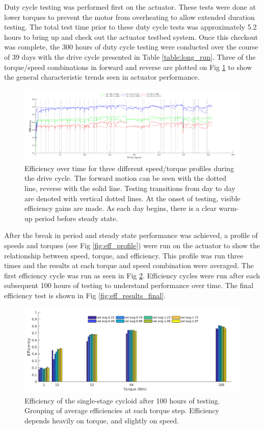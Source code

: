 Duty cycle testing was performed first on the actuator.
These tests were done at lower torques to prevent the motor from overheating to allow extended duration testing.
The total test time prior to these duty cycle tests was approximately 5.2 hours to bring up and check out the actuator testbed system.
Once this checkout was complete, the 300 hours of duty cycle testing were conducted over the course of 39 days with the drive cycle presented in Table \ref{table:long_run}.
Three of the torque/speed combinations in forward and reverse are plotted on Fig \ref{fig:long_run} to show the general characteristic trends seen in actuator performance.

\begin{figure}[!b]
   \centering
   \includegraphics[width=\linewidth]{fig/total_runtime}
   \caption{Efficiency over time for three different speed/torque profiles during the drive cycle.
   The forward motion can be seen with the dotted line, reverse with the solid line.
   Testing transitions from day to day are denoted with vertical dotted lines.
   At the onset of testing, visible efficiency gains are made.
   As each day begins, there is a clear warm-up period before steady state.
   }
   \label{fig:long_run}
\end{figure}

After the break in period and steady state performance was achieved, a profile of speeds and torques (see Fig \ref{fig:eff_profile}) were run on the actuator to show the relationship between speed, torque, and efficiency.
This profile was run three times and the results at each torque and speed combination were averaged. The first efficiency cycle was run as seen in Fig \ref{fig:eff_results}. Efficiency cycles were run after each subsequent 100 hours of testing to understand performance over time. The final efficiency test is shown in Fig \ref{fig:eff_results_final}.

\begin{figure}[h]
   \centering
   \includegraphics[width=0.8\linewidth]{fig/eff_test_bar_plot_v3}
   \caption{Efficiency of the single-stage cycloid after 100 hours of testing. Grouping of average efficiencies at each torque step.
   Efficiency depends heavily on torque, and slightly on speed.}
   \label{fig:eff_results}
\end{figure}

